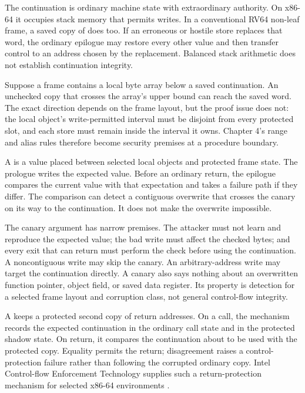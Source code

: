 The continuation is ordinary machine state with extraordinary authority. On
x86-64 it occupies stack memory that permits writes. In a conventional RV64 non-leaf
frame, a saved copy of  does too. If an erroneous or hostile store
replaces that word, the ordinary epilogue may restore every other value and
then transfer control to an address chosen by the replacement. Balanced stack
arithmetic does not establish continuation integrity.

Suppose a frame contains a local byte array below a saved continuation. An
unchecked copy that crosses the array's upper bound can reach the saved word.
The exact direction depends on the frame layout, but the proof issue does not:
the local object's write-permitted interval must be disjoint from every protected
slot, and each store must remain inside the interval it owns. Chapter 4's range
and alias rules therefore become security premises at a procedure boundary.

A  is a value placed between selected local objects and
protected frame state. The prologue writes the expected value. Before an
ordinary return, the epilogue compares the current value with that expectation
and takes a failure path if they differ. The comparison can detect a
contiguous overwrite that crosses the canary on its way to the continuation.
It does not make the overwrite impossible.

The canary argument has narrow premises. The attacker must not learn and
reproduce the expected value; the bad write must affect the checked bytes; and
every exit that can return must perform the check before using the
continuation. A noncontiguous write may skip the canary. An arbitrary-address
write may target the continuation directly. A canary also says nothing about
an overwritten function pointer, object field, or saved data register. Its
property is detection for a selected frame layout and corruption class, not
general control-flow integrity.

A  keeps a protected second copy of return addresses.
On a call, the mechanism records the expected continuation in
the ordinary call state and in the protected shadow state. On return, it
compares the continuation about to be used with the protected copy. Equality
permits the return; disagreement raises a control-protection failure rather
than following the corrupted ordinary copy. Intel Control-flow Enforcement
Technology supplies such a return-protection mechanism for selected x86-64
environments \autocite{intel2020cet}.

